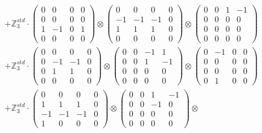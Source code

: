 \documentclass{article}
\begin{document}
{\begin{align}
        &+ \label{Rs16-Rc11-Solution-4-c22} \mathbb{Z}_3^{std} \cdot 
            \begin{pmatrix} 0 & 0 & 0 & 0 \\ 0 & 0 & 0 & 0 \\ 1 & -1 & 0 & 1 \\ 0 & 0 & 0 & 0 \end{pmatrix} \otimes 
            \begin{pmatrix} 0 & 0 & 0 & 0 \\ -1 & -1 & -1 & 0 \\ 1 & 1 & 1 & 0 \\ 0 & 0 & 0 & 0 \end{pmatrix} \otimes 
            \begin{pmatrix} 0 & 0 & 1 & -1 \\ 0 & 0 & 0 & 0 \\ 0 & 0 & 0 & 0 \\ 0 & 0 & 0 & 0 \end{pmatrix} \\ 
        &+ \label{Rs16-Rc11-Solution-4-c23} \mathbb{Z}_3^{std} \cdot 
            \begin{pmatrix} 0 & 0 & 0 & 0 \\ 0 & -1 & -1 & 0 \\ 0 & 1 & 1 & 0 \\ 0 & 0 & 0 & 0 \end{pmatrix} \otimes 
            \begin{pmatrix} 0 & 0 & -1 & 1 \\ 0 & 0 & 1 & -1 \\ 0 & 0 & 0 & 0 \\ 0 & 0 & 0 & 0 \end{pmatrix} \otimes 
            \begin{pmatrix} 0 & -1 & 0 & 0 \\ 0 & 0 & 0 & 0 \\ 0 & 0 & 0 & 0 \\ 0 & 1 & 0 & 0 \end{pmatrix} \\ 
        &+ \label{Rs16-Rc11-Solution-4-c24} \mathbb{Z}_3^{std} \cdot 
            \begin{pmatrix} 0 & 0 & 0 & 0 \\ 1 & 1 & 1 & 0 \\ -1 & -1 & -1 & 0 \\ 1 & 0 & 0 & 0 \end{pmatrix} \otimes 
            \begin{pmatrix} 0 & 0 & 1 & -1 \\ 0 & 0 & -1 & 0 \\ 0 & 0 & 0 & 0 \\ 0 & 0 & 0 & 0 \end{pmatrix} \otimes 

\end{align}}
\end{document}
